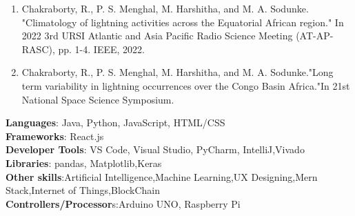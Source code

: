 \documentclass[11pt, a4paper]{russell}
\begin{document}
\begin{cventries}

\begin{enumerate}
    \item Chakraborty, R., P. S. Menghal, M. Harshitha, and M. A. Sodunke. "Climatology of lightning activities across the Equatorial African region." In 2022 3rd URSI Atlantic and Asia Pacific Radio Science Meeting (AT-AP-RASC), pp. 1-4. IEEE, 2022.
    \item Chakraborty, R., P. S. Menghal, M. Harshitha, and M. A. Sodunke."Long term variability in lightning occurrences over the Congo Basin Africa."In 21st National Space Science Symposium. 
\end{enumerate}
\end{cventries}

\vspace{15mm}


\begin{cventries}

\begin{itemize}[leftmargin=0.15in, label={}] 
\small{\item{ {\textbf{Languages}}{: Java, Python, JavaScript, HTML/CSS } \\
{\textbf{Frameworks}}{: React.js} \\
{\textbf{Developer Tools}}{: VS Code, Visual Studio, PyCharm, IntelliJ,Vivado} \\
{\textbf{Libraries}}{: pandas, Matplotlib,Keras}\\
{\textbf{Other skills}}{:Artificial Intelligence,Machine Learning,UX Designing,Mern Stack,Internet of Things,BlockChain}\\
{\textbf{Controllers/Processor}s}{:Arduino UNO, Raspberry Pi}
}}
\end{itemize}
\end{cventries}
\end{document}
